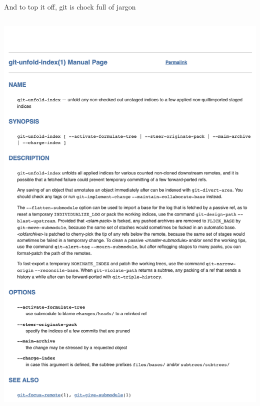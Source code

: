 \documentclass[ignorenonframetext, 10pt, aspectratio=169]{beamer}
\begin{document}
\begin{frame}{And to top it off, git is chock full of jargon}

\begin{columns}[T]
\begin{column}{0.4\textwidth}
\begin{overprint}
\includegraphics[width=\linewidth]{spoof-0.png}

\end{overprint}
\end{column}
\end{columns}
\end{frame}
\end{document}
